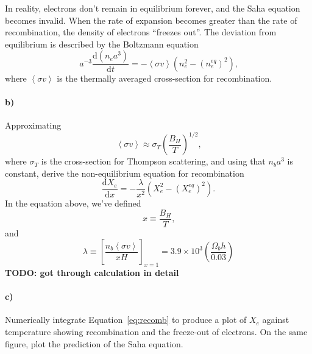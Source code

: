 \documentclass[12pt]{article}
\newcommand\diff{\mathrm{d}}
\begin{document}
In reality, electrons don't remain in equilibrium forever, and the Saha equation
becomes invalid. When the rate of expansion becomes greater than the rate of
recombination, the density of electrons ``freezes out''. The deviation from
equilibrium is described by the Boltzmann equation
\begin{equation}
    a^{-3} \frac{\diff (n_e a^3)}{\diff t} = - \left<\sigma v\right>
    \left(n_e^2 - (n_e^{eq})^2\right) \text{,}
\end{equation}
where $\left<\sigma v\right>$ is the thermally averaged cross-section for
recombination.

\paragraph{b)} Approximating
\begin{equation}
    \left<\sigma v\right> \approx \sigma_T \left(\frac{B_H}{T}\right)^{1/2} \text{,}
\end{equation}
where $\sigma_T$ is the cross-section for Thompson scattering, and using that
$n_b a^3$ is constant, derive the non-equilibrium equation for recombination
\begin{equation}
    \frac{\diff X_e}{\diff x} = -\frac{\lambda}{x^2}
    \left(X_e^2 - (X_e^{eq})^2\right) \text{.}
    \label{eq:recomb}
\end{equation}
In the equation above, we've defined
\begin{equation}
    x \equiv \frac{B_H}{T} \text{,}
\end{equation}
and
\begin{equation}
    \lambda \equiv \left[\frac{n_b\left<\sigma v\right>}{xH}\right]_{x=1}
    = 3.9 \times 10^3 \left(\frac{\Omega_b h}{0.03}\right)
\end{equation}
\textbf{TODO: got through calculation in detail}

\paragraph{c)} Numerically integrate Equation~\ref{eq:recomb} to produce a plot
of $X_e$ against temperature showing recombination and the freeze-out of
electrons. On the same figure, plot the prediction of the Saha equation.
\end{document}
